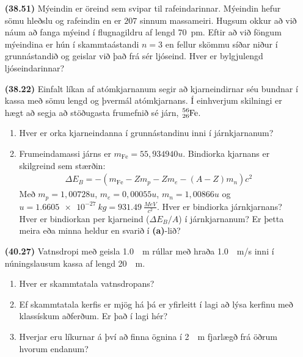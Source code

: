 \begin{enumerate}[label = \textbf{(\alph*)}]

\item[\textbf{(38.51)}] Mýeindin er öreind sem svipar til rafeindarinnar. Mýeindin hefur sömu hleðslu og rafeindin en er $207$ sinnum massameiri. Hugsum okkur að við náum að fanga mýeind í flugnagildru af lengd \SI{70}{pm}. Eftir að við föngum mýeindina er hún í skammtaástandi $n = 3$ en fellur skömmu síðar niður í grunnástandið og geislar við það frá sér ljóseind. Hver er bylgjulengd ljóseindarinnar?

\item[\textbf{(38.22)}] Einfalt líkan af atómkjarnanum segir að kjarneindirnar séu bundnar í kassa með sömu lengd og þvermál atómkjarnans. Í einhverjum skilningi er hægt að segja að stöðugasta frumefnið sé járn, $\ce{_{26}^{56}Fe}$.
\begin{enumerate}[label = \textbf{(\alph*)}]
    \item Hver er orka kjarneindanna í grunnástandinu inni í járnkjarnanum?
    \item Frumeindamassi járns er $m_{\text{Fe}} = 55,934940u$. Bindiorka kjarnans er skilgreind sem stærðin:
    \begin{align*}
        \Delta E_B = -\left( m_{\text{Fe}} - Zm_p - Z m_e - (A-Z)m_n\right)c^2
    \end{align*}
    Með $m_p = 1,00728u$, $m_e = 0,00055u$, $m_n = 1,00866u$ og $u = \SI{1.6605e-27}{kg} = \SI{931.49}{\frac{MeV}{c^2}}$. Hver er bindiorka járnkjarnans? Hver er bindiorkan per kjarneind ($\Delta E_B / A$) í járnkjarnanum? Er þetta meira eða minna heldur en svarið í \textbf{(a)}-lið?
\end{enumerate}


\item[\textbf{(40.27)}] Vatnsdropi með geisla \SI{1.0}{\mu m} rúllar með hraða \SI{1.0}{\mu m/s} inni í núningslausum kassa af lengd \SI{20}{\mu m}. \begin{enumerate}[label = \textbf{(\alph*)}]
    \item Hver er skammtatala vatnsdropans?
    \item Ef skammtatala kerfis er mjög há þá er yfirleitt í lagi að lýsa kerfinu með klassískum aðferðum. Er það í lagi hér?
    \item Hverjar eru líkurnar á því að finna ögnina í \SI{2}{\mu m} fjarlægð frá öðrum hvorum endanum?
\end{enumerate}


\end{enumerate}
